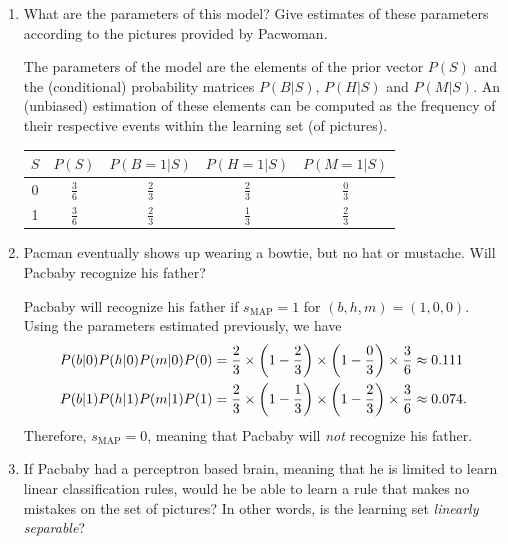 \documentclass[11pt, a4paper]{article}
\begin{document}
\begin{enumerate}
    \item What are the parameters of this model? Give estimates of these parameters according to the pictures provided by Pacwoman.

    \begin{solution}
        The parameters of the model are the elements of the prior vector $P(S)$ and the (conditional) probability matrices $P(B | S)$, $P(H | S)$ and $P(M | S)$. An (unbiased) estimation of these elements can be computed as the frequency of their respective events within the learning set (of pictures).

        \begin{table}[h]
            \centering
            \begin{tabular}{c|cccc}
                \toprule
                $S$ & $P(S)$ & $P(B = 1 | S)$ & $P(H = 1 | S)$ & $P(M = 1 | S)$ \\
                \midrule
                0 & $\frac{3}{6}$ & $\frac{2}{3}$ & $\frac{2}{3}$ & $\frac{0}{3}$ \\
                1 & $\frac{3}{6}$ & $\frac{2}{3}$ & $\frac{1}{3}$ & $\frac{2}{3}$ \\
                \bottomrule
            \end{tabular}
        \end{table}
    \end{solution}

    \item Pacman eventually shows up wearing a bowtie, but no hat or mustache. Will Pacbaby recognize his father?

    \begin{solution}
        Pacbaby will recognize his father if $s_{\text{MAP}} = 1$ for $(b, h, m) = (1, 0, 0)$. Using the parameters estimated previously, we have
        \begin{align*}
            P(b | 0) P(h | 0) P(m | 0) P(0) & = \frac{2}{3} \times \rbk*{1 - \frac{2}{3}} \times \rbk*{1 - \frac{0}{3}} \times \frac{3}{6} \approx \num{0.111} \\
            P(b | 1) P(h | 1) P(m | 1) P(1) & = \frac{2}{3} \times \rbk*{1 - \frac{1}{3}} \times \rbk*{1 - \frac{2}{3}} \times \frac{3}{6} \approx \num{0.074} .
        \end{align*}
        Therefore, $s_{\text{MAP}} = 0$, meaning that Pacbaby will \emph{not} recognize his father.
    \end{solution}

    \item If Pacbaby had a perceptron based brain, meaning that he is limited to learn linear classification rules, would he be able to learn a rule that makes no mistakes on the set of pictures? In other words, is the learning set \emph{linearly separable}?


\end{enumerate}
\end{document}
